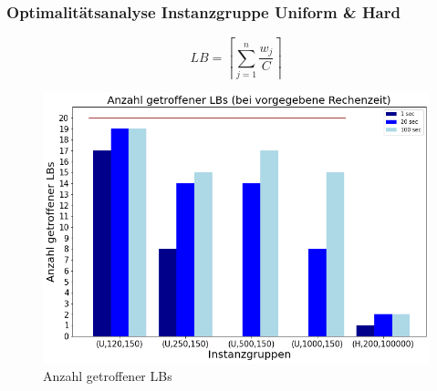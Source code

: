 \documentclass{beamer}
\begin{document}
\begin{frame}

\frametitle{Optimalitätsanalyse Instanzgruppe Uniform \& Hard}
\begin{footnotesize}
\begin{equation}
LB = \left\lceil\sum_{j=1}^{n} \frac{w_j}{C}\right\rceil
\end{equation}
\end{footnotesize}


\begin{figure}[!htbp]
\begin{center}
\includegraphics[scale=0.3]{img/lb_unif_hard.png}
\end{center}
\caption{Anzahl getroffener LBs}
\label{fig:LBs}
\end{figure}



\end{frame}
\end{document}
